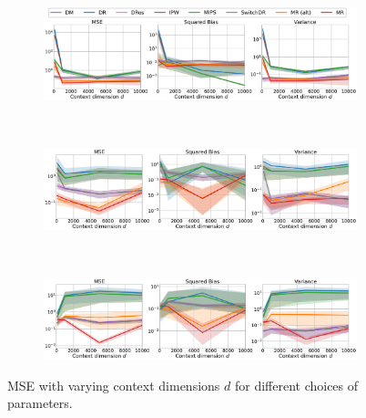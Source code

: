 \begin{figure}[h!]
    \centering
	\begin{subfigure}{0.8\textwidth}
	    \centering
	    \includegraphics[width=1\textwidth]{figures/mr/mips_experiments/ope_vs_d_nac_20_alphatar_0_8_n_200.png}
	    \label{subfig:na-20-neval-200-alphatar-0-8-d-mips}
	\end{subfigure}\\
	\begin{subfigure}{0.8\textwidth} 
	    \centering
	    \includegraphics[width=1\textwidth]{figures/mr/mips_experiments/ope_vs_d_nac_100_alphatar_0_8_n_200.png}
	    \label{subfig:na-100-neval-200-alphatar-0-8-d-mips}
	\end{subfigure}\\
	\begin{subfigure}{0.8\textwidth} 
	    \centering
	    \includegraphics[width=1\textwidth]{figures/mr/mips_experiments/ope_vs_d_nac_250_alphatar_0_8_n_200.png}
	    \label{subfig:na-250-neval-200-alphatar-0-8-d-mips}
	\end{subfigure}
    \caption{MSE with varying context dimensions $d$ for different choices of parameters.}
    \label{fig:mse-vs-d-mips}
\end{figure}

